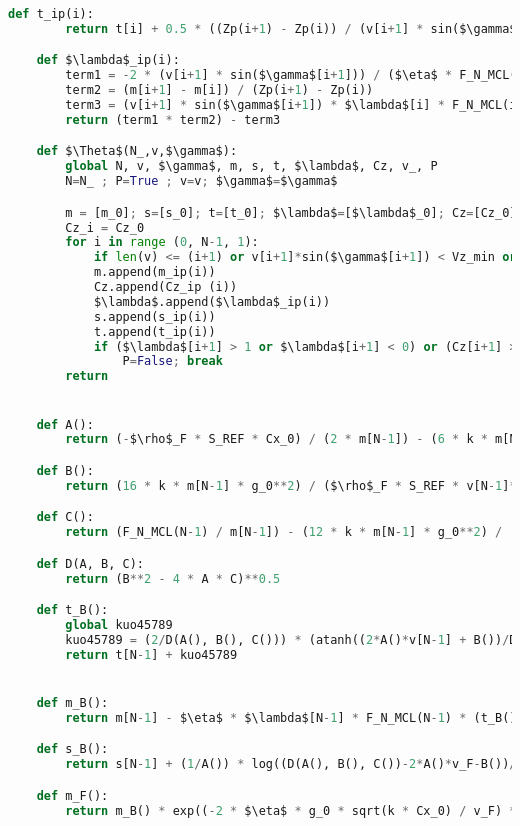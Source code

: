 \documentclass[fleqn]{article}
\begin{document}
\begin{lstlisting}[language=Python, firstnumber=last, style = mystyle, mathescape=true]
    def t_ip(i):
        return t[i] + 0.5 * ((Zp(i+1) - Zp(i)) / (v[i+1] * sin($\gamma$[i+1])) + (Zp(i+1) - Zp(i)) / (v[i] * sin($\gamma$[i])))

    def $\lambda$_ip(i):
        term1 = -2 * (v[i+1] * sin($\gamma$[i+1])) / ($\eta$ * F_N_MCL(i+1))
        term2 = (m[i+1] - m[i]) / (Zp(i+1) - Zp(i))
        term3 = (v[i+1] * sin($\gamma$[i+1]) * $\lambda$[i] * F_N_MCL(i)) / (F_N_MCL(i+1) * v[i] * sin($\gamma$[i]))
        return (term1 * term2) - term3

    def $\Theta$(N_,v,$\gamma$):
        global N, v, $\gamma$, m, s, t, $\lambda$, Cz, v_, P
        N=N_ ; P=True ; v=v; $\gamma$=$\gamma$

        m = [m_0]; s=[s_0]; t=[t_0]; $\lambda$=[$\lambda$_0]; Cz=[Cz_0]
        Cz_i = Cz_0
        for i in range (0, N-1, 1):
            if len(v) <= (i+1) or v[i+1]*sin($\gamma$[i+1]) < Vz_min or CAS(i+1) > VMO : P=False; N = i+1; break
            m.append(m_ip(i))
            Cz.append(Cz_ip (i))
            $\lambda$.append($\lambda$_ip(i))
            s.append(s_ip(i))
            t.append(t_ip(i))
            if ($\lambda$[i+1] > 1 or $\lambda$[i+1] < 0) or (Cz[i+1] > Cz_max or M(i+1) > MMO):
                P=False; break
        return


    def A():
        return (-$\rho$_F * S_REF * Cx_0) / (2 * m[N-1]) - (6 * k * m[N-1] * g_0**2) / ($\rho$_F * S_REF * v[N-1]**4)

    def B():
        return (16 * k * m[N-1] * g_0**2) / ($\rho$_F * S_REF * v[N-1]**3)

    def C():
        return (F_N_MCL(N-1) / m[N-1]) - (12 * k * m[N-1] * g_0**2) / ($\rho$_F * S_REF * v[N-1]**2)

    def D(A, B, C):
        return (B**2 - 4 * A * C)**0.5

    def t_B():
        global kuo45789
        kuo45789 = (2/D(A(), B(), C())) * (atanh((2*A()*v[N-1] + B())/D(A(), B(), C())) - atanh((2*A()*v_F + B())/D(A(), B(), C())))
        return t[N-1] + kuo45789


    def m_B(): 
        return m[N-1] - $\eta$ * $\lambda$[N-1] * F_N_MCL(N-1) * (t_B() - t[N-1])

    def s_B():
        return s[N-1] + (1/A()) * log((D(A(), B(), C())-2*A()*v_F-B())/(D(A(), B(), C())-2*A()*v[N-1]-B())) - (B()+D(A(), B(), C()))/(2*A()) * (t_B() - t[N-1])

    def m_F():
        return m_B() * exp((-2 * $\eta$ * g_0 * sqrt(k * Cx_0) / v_F) * (s_F - s_B()))


\end{lstlisting}
\end{document}
